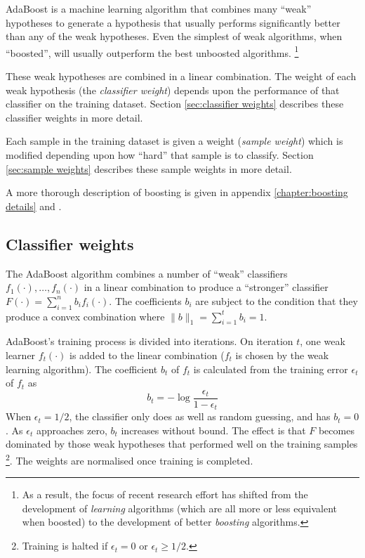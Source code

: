 AdaBoost is a machine learning algorithm
that combines many ``weak'' hypotheses to generate a hypothesis 
that usually performs significantly better than any of the weak
hypotheses.  Even the simplest of weak algorithms, when
``boosted'', will usually outperform the best unboosted algorithms.
\footnote{As a result, the focus of recent research effort has shifted from the
development of \emph{learning} algorithms (which are all more
or less equivalent when boosted) to the development of better \emph{boosting}
algorithms.}

These weak hypotheses are combined in a linear combination.
The weight of each weak hypothesis (the
\emph{classifier weight}) depends upon the performance of that
classifier on the training dataset.  Section \ref{sec:classifier
weights} describes these classifier weights in more detail.

Each sample in the training dataset is given a weight (\emph{sample
weight}) which is modified depending upon how ``hard'' that
sample is to classify.  Section \ref{sec:sample weights} describes
these sample weights in more detail.

A more thorough description of boosting is given in appendix
\ref{chapter:boosting details} and \cite{Freund96}.

\subsection{Classifier weights}
\label{sec:classifier weights}

The AdaBoost algorithm combines a number of ``weak'' classifiers
$f_1(\cdot), \ldots, f_n(\cdot)$ in a linear combination to produce a
``stronger'' classifier $F(\cdot) = \sum_{i=1}^{n} b_i f_i(\cdot)$.
The coefficients $b_i$ are subject to the condition that they produce a
convex combination where $\|b\|_1 = \sum_{i=1}^{t} b_i = 1$.

AdaBoost's training process is divided into iterations.  On iteration
$t$, one weak learner $f_t(\cdot)$ is added to the linear
combination ($f_t$ is chosen by the weak learning algorithm).  The
coefficient $b_t$ of $f_t$ is calculated from the 
training error $\epsilon_t$ of $f_t$ as 
%
\begin{equation}
b_t = - \log \frac{\epsilon_t}{1 - \epsilon_t}
\label{eqn:theory:bt}
\end{equation}
%
When $\epsilon_t = 1/2$, the classifier only does as
well as random guessing, and has $b_t = 0$.  As
$\epsilon_t$ approaches zero, $b_t$ increases without bound.  The
effect is that $F$ becomes dominated by those weak hypotheses that
performed well on the training samples
\footnote{Training is halted if $\epsilon_t = 0$ or $\epsilon_t \geq 1/2$.}.  The weights are normalised once training is completed.


